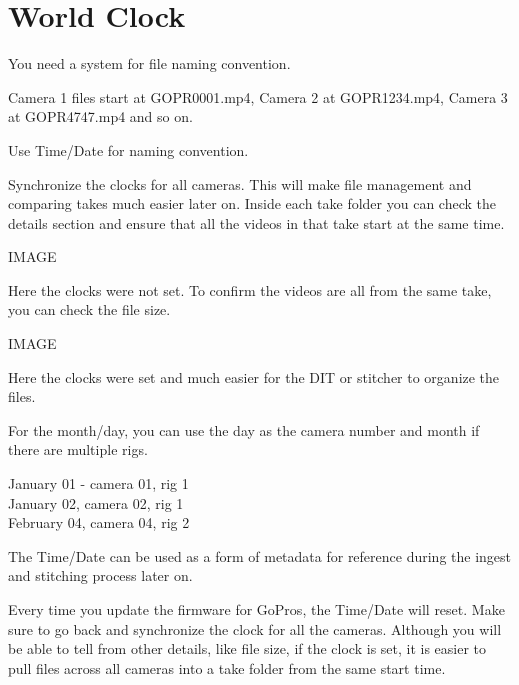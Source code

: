 \chapter{World Clock}
\pagecolor{white}
\label{chap:5}
\begin{fullwidth}


\problem

{\large You need a system for file naming convention.
 \par}

Camera 1 files start at GOPR0001.mp4, Camera 2 at GOPR1234.mp4, Camera 3 at GOPR4747.mp4 and so on. 


\solution

{\large Use Time/Date for naming convention.

 \par}

Synchronize the clocks for all cameras. This will make file management and comparing takes much easier later on. Inside each take folder you can check the details section and ensure that all the videos in that take start at the same time. 

IMAGE

Here the clocks were not set. To confirm the videos are all from the same take, you can check the file size. 

IMAGE

Here the clocks were set and much easier for the DIT or stitcher to organize the files.

For the month/day, you can use the day as the camera number and month if there are multiple rigs. 

January 01 - camera 01, rig 1
\\
January 02, camera 02, rig 1
\\
February 04, camera 04, rig 2


The Time/Date can be used as a form of metadata for reference during the ingest and stitching process later on. 

\tip Every time you update the firmware for GoPros, the Time/Date will reset. Make sure to go back and synchronize the clock for all the cameras. Although you will be able to tell from other details, like file size, if the clock is set, it is easier to pull files across all cameras into a take folder from the same start time. 




\clearpage
\end{fullwidth}
